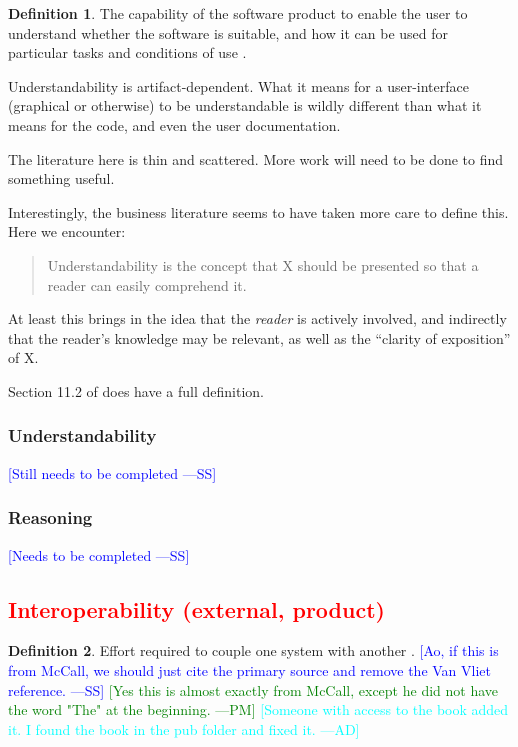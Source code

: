 \documentclass[letterpaper, cleveref]{lipics-v2019}
\newcommand{\authornote}[3]{\textcolor{#1}{[#3 ---#2]}}
\newcommand{\authornote}[3]{}
\newcommand{\wss}[1]{\authornote{blue}{SS}{#1}} %
\newcommand{\pmi}[1]{\authornote{green}{PM}{#1}} %
\newcommand{\ad}[1]{\authornote{cyan}{AD}{#1}} %
\newcommand{\notdone}[1]{\textcolor{red}{#1}}
\theoremstyle{definition}
\newtheorem{defn}{Definition}
\begin{document}
\begin{defn}
  The capability of the software product to enable the user to understand
  whether the software is suitable, and how it can be used for particular tasks
  and conditions of use \cite{ISO9126}. %
\end{defn}

Understandability is artifact-dependent.  What it means for a user-interface
(graphical or otherwise) to be understandable is wildly different than what
it means for the code, and even the user documentation.

The literature here is thin and scattered.  More work will need to be done
to find something useful.

Interestingly, the business literature seems to have taken more care to
define this.  Here we encounter:

\begin{quote}
  Understandability is the concept that X should be presented so that a reader
  can easily comprehend it.
\end{quote}

At least this brings in the idea that the \emph{reader} is actively involved,
and indirectly that the reader's knowledge may be relevant, as well as the
``clarity of exposition'' of X.

Section 11.2 of \citet{adams2015nonfunctional} does have a full definition.

\begin{mybox}
\subsubsection*{Understandability}
\wss{Still needs to be completed}
\end{mybox}

\subsubsection*{Reasoning}

\wss{Needs to be completed}


\subsection{\notdone{Interoperability (external, product)}} %

\begin{defn}
  Effort required to couple one system with another \citep{McCallEtAl1977}.
  \wss{Ao, if this is from McCall, we should just cite the primary source
  and remove the Van Vliet reference.} \pmi{Yes this is almost exactly from
  McCall, except he did not have the word "The" at the beginning.}
  \ad{Someone with access to the book added it. I found the book in the pub
  folder and fixed it.}
\end{defn}
\end{document}
